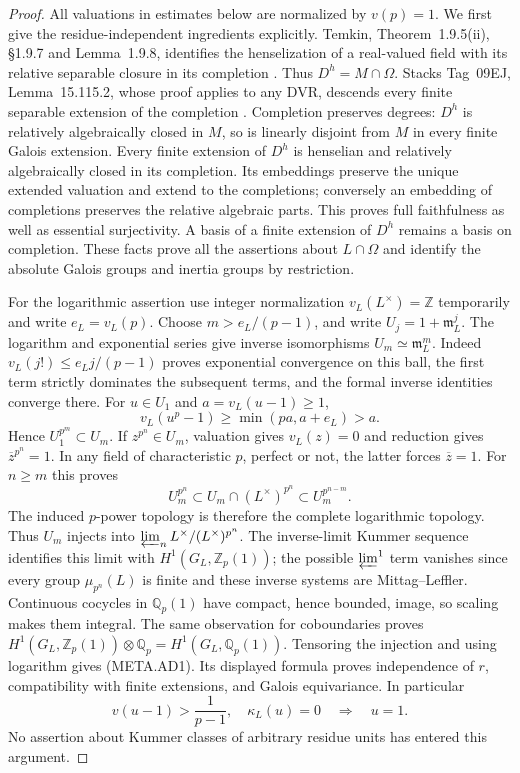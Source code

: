 \begin{proof}
All valuations in estimates below are normalized by $v(p)=1$.
We first give the residue-independent ingredients explicitly.
Temkin, Theorem~1.9.5(ii), \S1.9.7 and Lemma~1.9.8,
identifies the henselization of a real-valued field with
its relative separable closure in its completion
\citep{AN_TemkinValuations}.
Thus $D^h=M\cap\Omega$.
Stacks Tag~09EJ, Lemma~15.115.2, whose proof applies to
any DVR, descends every finite separable extension of
the completion \citep{AN_Stacks09EJ}.
Completion preserves degrees: $D^h$ is relatively
algebraically closed in $M$, so is linearly disjoint
from $M$ in every finite Galois extension.
Every finite extension of $D^h$ is henselian and relatively
algebraically closed in its completion.  Its embeddings
preserve the unique extended valuation and extend to
the completions; conversely an embedding of completions
preserves the relative algebraic parts.
This proves full faithfulness as well as essential
surjectivity.  A basis of a finite extension of $D^h$
remains a basis on completion.  These facts prove all
the assertions about $L\cap\Omega$ and identify the
absolute Galois groups and inertia groups by restriction.

For the logarithmic assertion use integer normalization
$v_L(L^\times)=\mathbb Z$ temporarily and write $e_L=v_L(p)$.
Choose $m>e_L/(p-1)$, and write $U_j=1+\mathfrak m_L^j$.
The logarithm and exponential series give inverse
isomorphisms $U_m\simeq\mathfrak m_L^m$.
Indeed $v_L(j!)\le e_Lj/(p-1)$ proves exponential
convergence on this ball, the first term strictly
dominates the subsequent terms, and the formal inverse
identities converge there.
For $u\in U_1$ and $a=v_L(u-1)\ge1$,
\[
             v_L(u^p-1)\ge\min(pa,a+e_L)>a.
\]
Hence $U_1^{p^m}\subset U_m$.
If $z^{p^n}\in U_m$, valuation gives $v_L(z)=0$ and
reduction gives $\overline z^{p^n}=1$.  In any field
of characteristic $p$, perfect or not, the latter
forces $\overline z=1$.
For $n\ge m$ this proves
\[
 U_m^{p^n}\subset U_m\cap(L^\times)^{p^n}
                       \subset U_m^{p^{n-m}}.                 \tag{META.AD2}
\]
The induced $p$-power topology is therefore the complete
logarithmic topology.  Thus $U_m$ injects into
$\varprojlim_n L^\times/(L^\times)^{p^n}$.
The inverse-limit Kummer sequence identifies this
limit with $H^1(G_L,\mathbb Z_p(1))$; the possible
$\varprojlim^1$ term vanishes since every group
$\mu_{p^n}(L)$ is finite and these inverse systems
are Mittag--Leffler.
Continuous cocycles in $\mathbb Q_p(1)$ have compact,
hence bounded, image, so scaling makes them integral.
The same observation for coboundaries proves
$H^1(G_L,\mathbb Z_p(1))\otimes\mathbb Q_p
=H^1(G_L,\mathbb Q_p(1))$.
Tensoring the injection and using logarithm gives
(META.AD1).  Its displayed formula proves independence
of $r$, compatibility with finite extensions, and
Galois equivariance.
In particular
\[
 v(u-1)>\frac1{p-1},\quad \kappa_L(u)=0
                         \quad\Longrightarrow\quad u=1.       \tag{META.AD3}
\]
No assertion about Kummer classes of arbitrary residue
units has entered this argument.


\end{proof}
